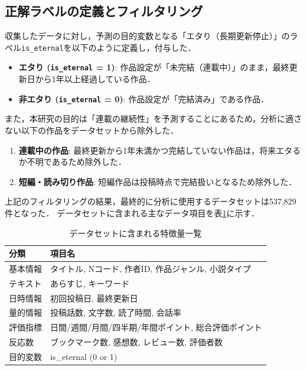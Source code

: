 \documentclass[uplatex, dvipdfmx, 11pt, a4paper, report]{jsbook}
\begin{document}
\subsection{正解ラベルの定義とフィルタリング}
収集したデータに対し，予測の目的変数となる「エタり（長期更新停止）」のラベル\texttt{is\_eternal}を以下のように定義し，付与した．

\begin{itemize}
  \item \textbf{エタり (\texttt{is\_eternal} = 1)}: 
  作品設定が「未完結（連載中）」のまま，最終更新日から1年以上経過している作品．
  \item \textbf{非エタり (\texttt{is\_eternal} = 0)}: 
  作品設定が「完結済み」である作品．
\end{itemize}

また，本研究の目的は「連載の継続性」を予測することにあるため，分析に適さない以下の作品をデータセットから除外した．

\begin{enumerate}
  \item \textbf{連載中の作品}: 
  最終更新から1年未満かつ完結していない作品は，将来エタるか不明であるため除外した．
  \item \textbf{短編・読み切り作品}: 
  短編作品は投稿時点で完結扱いとなるため除外した．
\end{enumerate}

上記のフィルタリングの結果，最終的に分析に使用するデータセットは537,829件となった．
データセットに含まれる主なデータ項目を表\ref{tab:dataset_columns}に示す．

\begin{table}[H]
  \centering
  \caption{データセットに含まれる特徴量一覧}
  \label{tab:dataset_columns}
  \begin{tabular}{|l|l|} \hline
    分類 & 項目名 \\ \hline
    基本情報 & タイトル, Nコード, 作者ID, 作品ジャンル, 小説タイプ \\
    テキスト & あらすじ, キーワード \\
    日時情報 & 初回投稿日, 最終更新日 \\
    量的情報 & 投稿話数, 文字数, 読了時間, 会話率 \\
    評価指標 & 日間/週間/月間/四半期/年間ポイント, 総合評価ポイント \\
    反応数 & ブックマーク数, 感想数, レビュー数, 評価者数 \\
    目的変数 & is\_eternal (0 or 1) \\ \hline
  \end{tabular}
\end{table}
\end{document}
